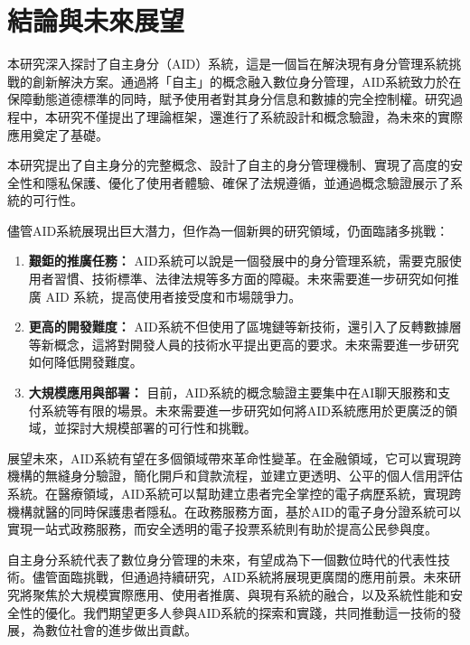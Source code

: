 
\chapter{結論與未來展望}
本研究深入探討了自主身分（AID）系統，這是一個旨在解決現有身分管理系統挑戰的創新解決方案。通過將「自主」的概念融入數位身分管理，AID系統致力於在保障動態道德標準的同時，賦予使用者對其身分信息和數據的完全控制權。研究過程中，本研究不僅提出了理論框架，還進行了系統設計和概念驗證，為未來的實際應用奠定了基礎。

本研究提出了自主身分的完整概念、設計了自主的身分管理機制、實現了高度的安全性和隱私保護、優化了使用者體驗、確保了法規遵循，並通過概念驗證展示了系統的可行性。

儘管AID系統展現出巨大潛力，但作為一個新興的研究領域，仍面臨諸多挑戰：
\begin{enumerate}
    \item \textbf{艱鉅的推廣任務：} AID系統可以說是一個發展中的身分管理系統，需要克服使用者習慣、技術標準、法律法規等多方面的障礙。未來需要進一步研究如何推廣 AID 系統，提高使用者接受度和市場競爭力。
    \item \textbf{更高的開發難度：} AID系統不但使用了區塊鏈等新技術，還引入了反轉數據層等新概念，這將對開發人員的技術水平提出更高的要求。未來需要進一步研究如何降低開發難度。
    \item \textbf{大規模應用與部署：} 目前，AID系統的概念驗證主要集中在AI聊天服務和支付系統等有限的場景。未來需要進一步研究如何將AID系統應用於更廣泛的領域，並探討大規模部署的可行性和挑戰。
\end{enumerate}

展望未來，AID系統有望在多個領域帶來革命性變革。在金融領域，它可以實現跨機構的無縫身分驗證，簡化開戶和貸款流程，並建立更透明、公平的個人信用評估系統。在醫療領域，AID系統可以幫助建立患者完全掌控的電子病歷系統，實現跨機構就醫的同時保護患者隱私。在政務服務方面，基於AID的電子身分證系統可以實現一站式政務服務，而安全透明的電子投票系統則有助於提高公民參與度。

自主身分系統代表了數位身分管理的未來，有望成為下一個數位時代的代表性技術。儘管面臨挑戰，但通過持續研究，AID系統將展現更廣闊的應用前景。未來研究將聚焦於大規模實際應用、使用者推廣、與現有系統的融合，以及系統性能和安全性的優化。我們期望更多人參與AID系統的探索和實踐，共同推動這一技術的發展，為數位社會的進步做出貢獻。